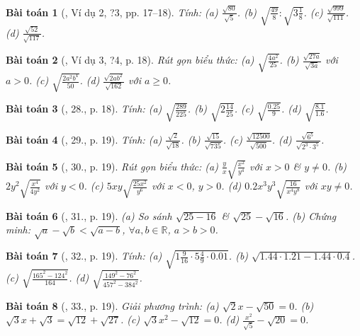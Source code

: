 \documentclass{article}
\newtheorem{baitoan}{Bài toán}
\begin{document}
\begin{baitoan}[\cite{SGK_Toan_9_tap_1}, Ví dụ 2, ?3, pp. 17--18]
	Tính: (a) $\frac{\sqrt{80}}{\sqrt{5}}$. (b) $\sqrt{\frac{49}{8}}:\sqrt{3\frac{1}{8}}$. (c) $\frac{\sqrt{999}}{\sqrt{111}}$. (d) $\frac{\sqrt{52}}{\sqrt{117}}$.
\end{baitoan}

\begin{baitoan}[\cite{SGK_Toan_9_tap_1}, Ví dụ 3, ?4, p. 18]
	Rút gọn biểu thức: (a) $\sqrt{\frac{4a^2}{25}}$. (b) $\frac{\sqrt{27a}}{\sqrt{3a}}$ với $a > 0$. (c) $\sqrt{\frac{2a^2b^4}{50}}$. (d) $\frac{\sqrt{2ab^2}}{\sqrt{162}}$ với $a\ge0$.
\end{baitoan}

\begin{baitoan}[\cite{SGK_Toan_9_tap_1}, 28., p. 18]
	Tính: (a) $\sqrt{\frac{289}{225}}$. (b) $\sqrt{2\frac{14}{25}}$. (c) $\sqrt{\frac{0.25}{9}}$. (d) $\sqrt{\frac{8.1}{1.6}}$.
\end{baitoan}

\begin{baitoan}[\cite{SGK_Toan_9_tap_1}, 29., p. 19]
	Tính: (a) $\frac{\sqrt{2}}{\sqrt{18}}$. (b) $\frac{\sqrt{15}}{\sqrt{735}}$. (c) $\frac{\sqrt{12500}}{\sqrt{500}}$. (d) $\frac{\sqrt{6^5}}{\sqrt{2^3\cdot3^5}}$.
\end{baitoan}

\begin{baitoan}[\cite{SGK_Toan_9_tap_1}, 30., p. 19]
	Rút gọn biểu thức: (a) $\frac{y}{x}\sqrt{\frac{x^2}{y^4}}$ với $x > 0$ \& $y\ne0$. (b) $2y^2\sqrt{\frac{x^4}{4y^2}}$ với $y < 0$. (c) $5xy\sqrt{\frac{25x^2}{y^6}}$ với $x < 0$, $y > 0$. (d) $0.2x^3y^3\sqrt{\frac{16}{x^4y^8}}$ với $xy\ne0$.
\end{baitoan}

\begin{baitoan}[\cite{SGK_Toan_9_tap_1}, 31., p. 19]
	(a) So sánh $\sqrt{25 - 16}$ \& $\sqrt{25} - \sqrt{16}$. (b) Chứng minh: $\sqrt{a} - \sqrt{b} < \sqrt{a - b}$, $\forall a,b\in\mathbb{R}$, $a > b > 0$.
\end{baitoan}

\begin{baitoan}[\cite{SGK_Toan_9_tap_1}, 32., p. 19]
	Tính: (a) $\sqrt{1\frac{9}{16}\cdot5\frac{4}{9}\cdot0.01}$. (b) $\sqrt{1.44\cdot1.21 - 1.44\cdot0.4}$. (c) $\sqrt{\frac{165^2 - 124^2}{164}}$. (d) $\sqrt{\frac{149^2 - 76^2}{457^2 - 384^2}}$.
\end{baitoan}

\begin{baitoan}[\cite{SGK_Toan_9_tap_1}, 33., p. 19]
	Giải phương trình: (a)  $\sqrt{2}x - \sqrt{50} = 0$. (b) $\sqrt{3}x + \sqrt{3} = \sqrt{12} + \sqrt{27}$. (c) $\sqrt{3}x^2 - \sqrt{12} = 0$. (d) $\frac{x^2}{\sqrt{5}} - \sqrt{20} = 0$.
\end{baitoan}
\end{document}
